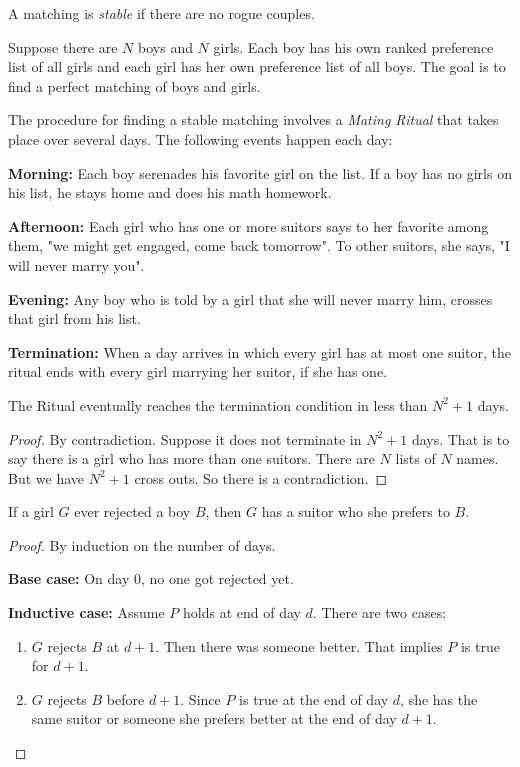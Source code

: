 \documentclass[11pt]{article}
\begin{document}
\begin{definition}
A matching is \emph{stable} if there are no rogue couples.
\end{definition}

\begin{definition}
Suppose there are $N$ boys and $N$ girls. Each boy has his own ranked preference list of all girls
and each girl has her own preference list of all boys. The goal is to find a perfect matching of
boys and girls.
\end{definition}

\begin{definition}
The procedure for finding a stable matching involves a \emph{Mating Ritual} that takes place over
several days. The following events happen each day:

\textbf{Morning:} Each boy serenades his favorite girl on the list. If a boy has no girls on his
list, he stays home and does his math homework.

\textbf{Afternoon:} Each girl who has one or more suitors says to her favorite among them, "we might
get engaged, come back tomorrow". To other suitors, she says, "I will never marry you".

\textbf{Evening:} Any boy who is told by a girl that she will never marry him, crosses that girl from
his list.

\textbf{Termination:} When a day arrives in which every girl has at most one suitor, the ritual ends
with every girl marrying her suitor, if she has one.
\end{definition}

\begin{theorem}
The Ritual eventually reaches the termination condition in less than $N^2+1$ days.
\end{theorem}

\begin{proof}
By contradiction. Suppose it does not terminate in $N^2+1$ days. That is to say there is a girl who
has more than one suitors. There are $N$ lists of $N$ names. But we have $N^2+1$ cross outs. So there
is a contradiction.
\end{proof}

\begin{lemma}
If a girl $G$ ever rejected a boy $B$, then $G$ has a suitor who she prefers to $B$.
\end{lemma}

\begin{proof}
By induction on the number of days.

\textbf{Base case:}  On day $0$, no one got rejected yet.

\textbf{Inductive case:} Assume $P$ holds at end of day $d$. There are two cases:
\begin{enumerate}
\item $G$ rejects $B$ at $d+1$. Then there was someone better. That implies $P$ is true for $d+1$.
\item $G$ rejects $B$ before $d+1$. Since $P$ is true at the end of day $d$, she has the same suitor
or someone she prefers better at the end of day $d+1$.
\end{enumerate}
\end{proof}
\end{document}
